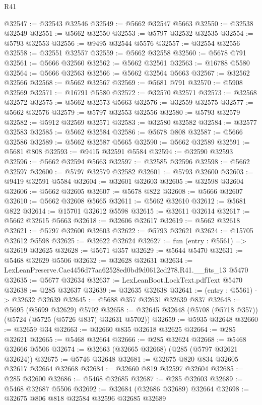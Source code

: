\begin{lexlean}{R41}
\begin{coremodule}
@32547 := @32543 @32546
@32549 := @5662 @32547 @5663
@32550 := @32538 @32549
@32551 := @5662 @32550
@32553 := @5797 @32532 @32535
@32554 := @5793 @32553
@32556 := @9495 @32544 @5576
@32557 := @32554 @32556
@32558 := @32551 @32557
@32559 := @5662 @32558
@32560 := @5678 @791
@32561 := @5666 @32560
@32562 := @5662 @32561
@32563 := @16788 @5580
@32564 := @5666 @32563
@32566 := @5662 @32564 @5663
@32567 := @32562 @32566
@32568 := @5662 @32567
@32569 := @5681 @791
@32570 := @5908 @32569
@32571 := @16791 @5580
@32572 := @32570 @32571
@32573 := @32568 @32572
@32575 := @5662 @32573 @5663
@32576 := @32559 @32575
@32577 := @5662 @32576
@32579 := @5797 @32553 @32556
@32580 := @5793 @32579
@32582 := @5912 @32569 @32571
@32583 := @32580 @32582
@32584 := @32577 @32583
@32585 := @5662 @32584
@32586 := @5678 @808
@32587 := @5666 @32586
@32589 := @5662 @32587 @5665
@32590 := @5662 @32589
@32591 := @5681 @808
@32593 := @9415 @32591 @5584
@32594 := @32590 @32593
@32596 := @5662 @32594 @5663
@32597 := @32585 @32596
@32598 := @5662 @32597
@32600 := @5797 @32579 @32582
@32601 := @5793 @32600
@32603 := @9419 @32591 @5584
@32604 := @32601 @32603
@32605 := @32598 @32604
@32606 := @5662 @32605
@32607 := @5678 @822
@32608 := @5666 @32607
@32610 := @5662 @32608 @5665
@32611 := @5662 @32610
@32612 := @5681 @822
@32614 := @15701 @32612 @5598
@32615 := @32611 @32614
@32617 := @5662 @32615 @5663
@32618 := @32606 @32617
@32619 := @5662 @32618
@32621 := @5797 @32600 @32603
@32622 := @5793 @32621
@32624 := @15705 @32612 @5598
@32625 := @32622 @32624
@32627 := fun (entry : @5561) => @32619 @32625
@32628 := @5671 @357
@32629 := @5644 @5470
@32631 := @5468 @32629 @5506
@32632 := @32628 @32631
@32634 := LexLeanPreserve.Cae4456d77aa62528ed0bd9d0612cd278.R41.__fits_13 @5470
@32635 := @5677 @32634
@32637 := LexLeanBoot.LockText.pdfText @5470
@32638 := @285 @32637
@32639 := @32635 @32638
@32641 := (entry : @5561) -> @32632 @32639
@32645 := @5688 @357 @32631 @32639 @837
@32648 := @5695 (@5699 @32629) @5702
@32658 := @32645 @32648 (@5708 (@5718 @357)) (@5724 (@5725 (@5726 @837) @32631 @5702))
@32659 := @5935 @32648
@32660 := @32659 @34
@32663 := @32660 @835 @32618 @32625
@32664 := @285 @32621
@32665 := @5468 @32664
@32666 := @285 @32624
@32668 := @5468 @32666 @5506
@32674 := @32663 (@32665 @32668) (@285 (@5797 @32621 @32624))
@32675 := @5746 @32648
@32681 := @32675 @820 @834 @32605 @32617 @32664 @32668
@32684 := @32660 @819 @32597 @32604
@32685 := @285 @32600
@32686 := @5468 @32685
@32687 := @285 @32603
@32689 := @5468 @32687 @5506
@32692 := @32684 (@32686 @32689) @32664
@32698 := @32675 @806 @818 @32584 @32596 @32685 @32689

\end{coremodule}
\end{lexlean}
